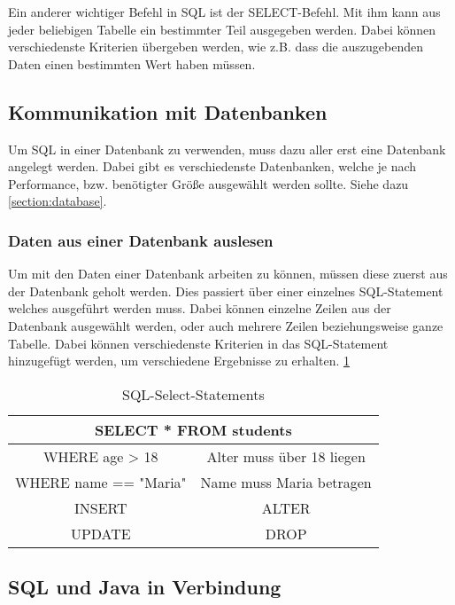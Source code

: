 Ein anderer wichtiger Befehl in SQL ist der SELECT-Befehl. Mit ihm kann aus jeder beliebigen Tabelle ein bestimmter Teil ausgegeben werden. Dabei können verschiedenste Kriterien übergeben werden, wie z.B. dass die auszugebenden Daten einen bestimmten Wert haben müssen. \cite{grundlagenSQL}
 
 
\subsection{Kommunikation mit Datenbanken}
Um SQL in einer Datenbank zu verwenden, muss dazu aller erst eine Datenbank angelegt werden. Dabei gibt es verschiedenste Datenbanken, welche je nach Performance, bzw. benötigter Größe ausgewählt werden sollte. Siehe dazu \ref{section:database}.
 
\subsubsection{Daten aus einer Datenbank auslesen}
Um mit den Daten einer Datenbank arbeiten zu können, müssen diese zuerst aus der Datenbank geholt werden. Dies passiert über einer einzelnes SQL-Statement welches ausgeführt werden muss. Dabei können einzelne Zeilen aus der Datenbank ausgewählt werden, oder auch mehrere Zeilen beziehungsweise ganze Tabelle. Dabei können verschiedenste Kriterien in das SQL-Statement hinzugefügt werden, um verschiedene Ergebnisse zu erhalten. \cite{einfuerhungSQLBuch} \ref{tab:allgemein:selects}

\begin{table}
    \centering
    \begin{tabular}{ |c|c| }
     \hline
     \multicolumn{2}{|c|}{SELECT * FROM students } \\
     \hline
     \hline
     WHERE age > 18 & Alter muss über 18 liegen \\
     \hline
     \hline
     WHERE name == "Maria" & Name muss Maria betragen  \\
     \hline
     INSERT & ALTER \\
     \hline
     UPDATE & DROP  \\
     \hline
    \end{tabular}
    \caption{SQL-Select-Statements \cite{einfuerhungSQLBuch}}
    \label{tab:allgemein:selects}
\end{table}

    


\subsection{SQL und Java in Verbindung}

